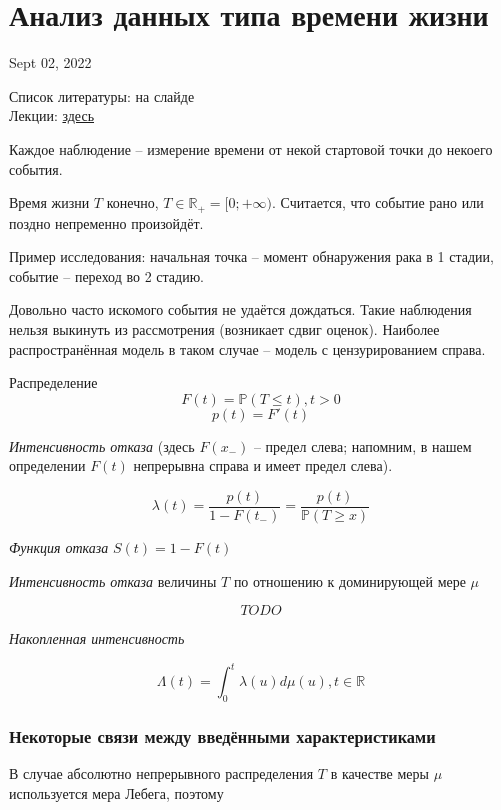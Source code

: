 \documentclass[main.tex]{sufbfiles}
\begin{document}
\section{Анализ данных типа времени жизни}
Sept 02, 2022

Список литературы: на слайде \\

Лекции: \href{https://sites.google.com/site/malovsergvas/%D0%BC%D0%B5%D1%82%D0%BE%D0%B4%D0%B8%D1%87%D0%B5%D1%81%D0%BA%D0%B8%D0%B5-%D0%BC%D0%B0%D1%82%D0%B5%D1%80%D0%B8%D0%B0%D0%BB%D1%8B/%D0%B8%D0%B7%D0%B1%D1%80%D0%B0%D0%BD%D0%BD%D1%8B%D0%B5-%D0%BB%D0%B5%D0%BA%D1%86%D0%B8%D0%B8}{здесь}

Каждое наблюдение -- измерение времени от некой стартовой точки до некоего события.

Время жизни $ T $  конечно, $ T \in \mathds R_+ = [0; + \infty) $.
Считается, что событие рано или поздно непременно произойдёт.

Пример исследования: начальная точка -- момент обнаружения рака в 1 стадии, событие -- переход во 2 стадию.

Довольно часто искомого события не удаётся дождаться.
Такие наблюдения нельзя выкинуть из рассмотрения (возникает сдвиг оценок).
Наиболее распространённая модель в таком случае -- модель с цензурированием справа.

Распределение
\[ F(t) = \mathds P (T \le t), t > 0 \]
\[ p(t) = F'(t) \]

\emph{Интенсивность отказа} (здесь $ F(x_-) $ -- предел слева; напомним, в нашем определении $ F(t) $ непрерывна справа и имеет предел слева).

\[ \lambda(t) = \frac{p(t)}{ 1 - F(t_-) } = \frac{p(t)}{\mathds P (T \ge x)}  \]

\emph{Функция отказа} $ S(t) = 1 - F(t) $

\emph{Интенсивность отказа} величины $ T $ по отношению к доминирующей мере $ \mu $

\[ TODO \]

\emph{Накопленная интенсивность}

\[ \Lambda(t) = \int_0^t \lambda(u) d \mu(u), t \in \mathds R \]

\subsubsection{ Некоторые связи между введёнными характеристиками }

В случае абсолютно непрерывного распределения $ T $ в качестве меры $ \mu $ используется мера Лебега, поэтому
\end{document}
